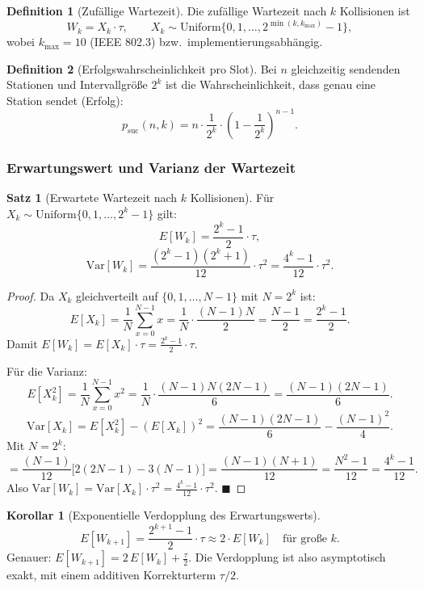 ﻿\documentclass[a4paper,12pt]{article}
\theoremstyle{definition}
\newtheorem{definition}{Definition}
\newtheorem{satz}{Satz}
\newtheorem{korollar}{Korollar}
\begin{document}
\begin{definition}[Zufällige Wartezeit]
Die zufällige Wartezeit nach $k$ Kollisionen ist
\[
  W_k = X_k \cdot \tau, \qquad
  X_k \sim \mathrm{Uniform}\bigl\{0, 1, \ldots, 2^{\min(k,k_{\max})}-1\bigr\},
\]
wobei $k_{\max} = 10$ (IEEE 802.3) bzw.\ implementierungsabhängig.
\end{definition}

\begin{definition}[Erfolgswahrscheinlichkeit pro Slot]
Bei $n$ gleichzeitig sendenden Stationen und Intervallgröße $2^k$
ist die Wahrscheinlichkeit, dass genau eine Station sendet (Erfolg):
\[
  p_{\mathrm{suc}}(n, k) = n \cdot \frac{1}{2^k}
    \cdot \left(1 - \frac{1}{2^k}\right)^{n-1}.
\]
\end{definition}

\subsubsection{Erwartungswert und Varianz der Wartezeit}

\begin{satz}[Erwartete Wartezeit nach $k$ Kollisionen]
\label{satz:erwartung_backoff}
Für $X_k \sim \mathrm{Uniform}\{0, 1, \ldots, 2^k - 1\}$ gilt:
\[
  E[W_k] = \frac{2^k - 1}{2} \cdot \tau,
\]
\[
  \mathrm{Var}[W_k] = \frac{(2^k - 1)(2^k + 1)}{12} \cdot \tau^2
                    = \frac{4^k - 1}{12} \cdot \tau^2.
\]
\end{satz}

\begin{proof}
Da $X_k$ gleichverteilt auf $\{0, 1, \ldots, N-1\}$ mit $N = 2^k$ ist:
\[
  E[X_k] = \frac{1}{N}\sum_{x=0}^{N-1} x
          = \frac{1}{N} \cdot \frac{(N-1)N}{2}
          = \frac{N-1}{2}
          = \frac{2^k - 1}{2}.
\]
Damit $E[W_k] = E[X_k] \cdot \tau = \frac{2^k-1}{2} \cdot \tau$.

Für die Varianz:
\[
  E[X_k^2] = \frac{1}{N}\sum_{x=0}^{N-1} x^2
            = \frac{1}{N} \cdot \frac{(N-1)N(2N-1)}{6}
            = \frac{(N-1)(2N-1)}{6}.
\]
\[
  \mathrm{Var}[X_k]
  = E[X_k^2] - (E[X_k])^2
  = \frac{(N-1)(2N-1)}{6} - \frac{(N-1)^2}{4}.
\]
Mit $N = 2^k$:
\[
  = \frac{(N-1)}{12}\bigl[2(2N-1) - 3(N-1)\bigr]
  = \frac{(N-1)(N+1)}{12}
  = \frac{N^2 - 1}{12}
  = \frac{4^k - 1}{12}.
\]
Also $\mathrm{Var}[W_k] = \mathrm{Var}[X_k] \cdot \tau^2 = \frac{4^k-1}{12} \cdot \tau^2$.
\hfill$\blacksquare$
\end{proof}

\begin{korollar}[Exponentielle Verdopplung des Erwartungswerts]
\[
  E[W_{k+1}] = \frac{2^{k+1}-1}{2}\cdot\tau
             \approx 2 \cdot E[W_k] \quad \text{für große } k.
\]
Genauer: $E[W_{k+1}] = 2\,E[W_k] + \tfrac{\tau}{2}$.
Die Verdopplung ist also asymptotisch exakt, mit einem additiven
Korrekturterm $\tau/2$.
\end{korollar}
\end{document}
